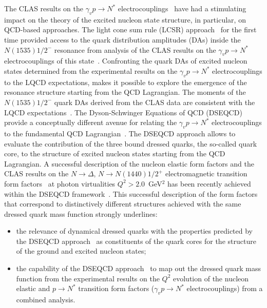The CLAS results on the $\gamma_vp \rightarrow N^*$ electrocouplings~\cite{Aznauryan:2009mx,Aznauryan:2011qj,Mokeev:2012vsa,Mokeev:2013kka,Park:2014yea,Mokeev:2015lda} have had a stimulating 
impact on the theory of the excited nucleon state structure, in particular, on QCD-based approaches. The light cone sum rule (LCSR) approach~\cite{Anikin:2015ita,Braun:2014wpa} for the first time provided access to the quark 
distribution amplitudes (DAs) inside the $N(1535)1/2^-$ resonance from analysis of the CLAS results on the
$\gamma_vp \rightarrow N^*$ electrocouplings of this state~\cite{Aznauryan:2009mx}. Confronting the quark DAs of excited nucleon states 
determined from the experimental results on the $\gamma_vp \rightarrow N^*$ electrocouplings to the LQCD expectations, makes 
it possible to explore the emergence of the resonance structure starting from the QCD Lagrangian. The moments 
of the $N(1535)1/2^-$ quark DAs derived from the CLAS data are consistent with the LQCD expectations~\cite{Braun:2014wpa}. The Dyson-Schwinger Equations of QCD (DSEQCD) provide a conceptually different avenue for relating the 
$\gamma_vp  \rightarrow N^*$ electrocouplings to the fundamental QCD Lagrangian~\cite{Segovia:2014aza,Binosi:2014aea,Segovia:2015hra}. The DSEQCD 
approach allows to evaluate the contribution of the three bound dressed quarks, the so-called quark 
core, to the structure of excited nucleon states starting from the QCD Lagrangian. A successful description of 
the nucleon elastic form factors and the CLAS results on the $N \to \Delta$, $N \to N(1440)1/2^+$ electromagnetic transition 
 form factors~\cite{Aznauryan:2009mx,Mokeev:2012vsa,Aznauryan:2011qj,Mokeev:2013kka} at photon virtualities $Q^2 > 2.0$~GeV$^2$ has been 
recently achieved within the DSEQCD framework~\cite{Cloet:2013gva,Segovia:2014aza,Segovia:2015hra}. This successful 
description of the form factors that correspond to distinctively different 
structures achieved with the same dressed quark mass function strongly underlines:
\begin{itemize}
\item the relevance of dynamical dressed quarks with the properties predicted by the DSEQCD approach~\cite{Cloet:2013jya} 
as constituents of the quark cores for the structure of the ground and excited nucleon states;
\item the capability of the DSEQCD approach~\cite{Segovia:2014aza,Segovia:2015hra} to map out the dressed quark mass function from 
the experimental results on the $Q^2$ evolution of the nucleon elastic and $p \to N^*$ transition form 
factors ($\gamma_vp \rightarrow N^*$ electrocouplings) from a combined analysis.
\end{itemize}
 
